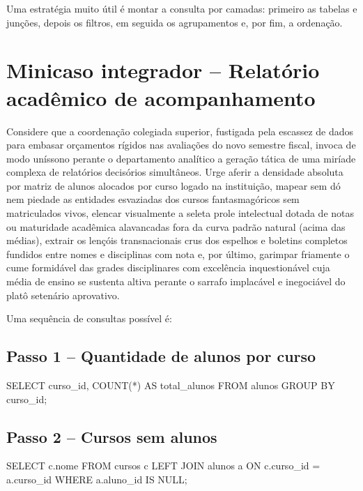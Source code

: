 \begin{quadro_dica}
Uma estratégia muito útil é montar a consulta por camadas: primeiro as tabelas e junções, depois os filtros, em seguida os agrupamentos e, por fim, a ordenação.
\end{quadro_dica}

\section{Minicaso integrador -- Relatório acadêmico de acompanhamento}

Considere que a coordenação colegiada superior, fustigada pela escassez de dados para embasar orçamentos rígidos nas avaliações do novo semestre fiscal, invoca de modo uníssono perante o departamento analítico a geração tática de uma miríade complexa de relatórios decisórios simultâneos. Urge aferir a densidade absoluta por matriz de alunos alocados por curso logado na instituição, mapear sem dó nem piedade as entidades esvaziadas dos cursos fantasmagóricos sem matriculados vivos, elencar visualmente a seleta prole intelectual dotada de notas ou maturidade acadêmica alavancadas fora da curva padrão natural (acima das médias), extrair os lençóis transnacionais crus dos espelhos e boletins completos fundidos entre nomes e disciplinas com nota e, por último, garimpar friamente o cume formidável das grades disciplinares com excelência inquestionável cuja média de ensino se sustenta altiva perante o sarrafo implacável e inegociável do platô setenário aprovativo.

Uma sequência de consultas possível é:

\subsection*{Passo 1 -- Quantidade de alunos por curso}

\begin{sqlcode}
SELECT
    curso_id,
    COUNT(*) AS total_alunos
FROM alunos
GROUP BY curso_id;
\end{sqlcode}

\subsection*{Passo 2 -- Cursos sem alunos}

\begin{sqlcode}
SELECT c.nome
FROM cursos c
LEFT JOIN alunos a
    ON c.curso_id = a.curso_id
WHERE a.aluno_id IS NULL;
\end{sqlcode}

